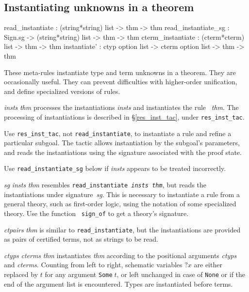 \subsection{Instantiating unknowns in a theorem} \label{sec:instantiate}
\begin{ttbox}
read_instantiate    :                (string*string) list -> thm -> thm
read_instantiate_sg :     Sign.sg -> (string*string) list -> thm -> thm
cterm_instantiate   :                  (cterm*cterm) list -> thm -> thm
instantiate'      : ctyp option list -> cterm option list -> thm -> thm
\end{ttbox}
These meta-rules instantiate type and term unknowns in a theorem.  They are
occasionally useful.  They can prevent difficulties with higher-order
unification, and define specialized versions of rules.
\begin{ttdescription}
\item[\ttindexbold{read_instantiate} {\it insts} {\it thm}] 
processes the instantiations {\it insts} and instantiates the rule~{\it
thm}.  The processing of instantiations is described
in \S\ref{res_inst_tac}, under {\tt res_inst_tac}.  

Use {\tt res_inst_tac}, not {\tt read_instantiate}, to instantiate a rule
and refine a particular subgoal.  The tactic allows instantiation by the
subgoal's parameters, and reads the instantiations using the signature
associated with the proof state.

Use {\tt read_instantiate_sg} below if {\it insts\/} appears to be treated
incorrectly.

\item[\ttindexbold{read_instantiate_sg} {\it sg} {\it insts} {\it thm}]
  resembles \hbox{\tt read_instantiate {\it insts} {\it thm}}, but reads
  the instantiations under signature~{\it sg}.  This is necessary to
  instantiate a rule from a general theory, such as first-order logic,
  using the notation of some specialized theory.  Use the function {\tt
    sign_of} to get a theory's signature.

\item[\ttindexbold{cterm_instantiate} {\it ctpairs} {\it thm}] 
is similar to {\tt read_instantiate}, but the instantiations are provided
as pairs of certified terms, not as strings to be read.

\item[\ttindexbold{instantiate'} {\it ctyps} {\it cterms} {\it thm}]
  instantiates {\it thm} according to the positional arguments {\it
    ctyps} and {\it cterms}.  Counting from left to right, schematic
  variables $?x$ are either replaced by $t$ for any argument
  \texttt{Some\(\;t\)}, or left unchanged in case of \texttt{None} or
  if the end of the argument list is encountered.  Types are
  instantiated before terms.

\end{ttdescription}


